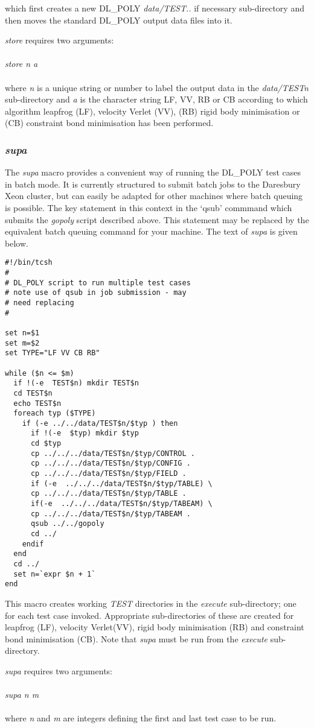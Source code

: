 \noindent which first creates a new DL\_POLY {\em data/TEST..} if necessary
sub-directory and then moves the standard
DL\_POLY output data files into it.

{\sl store} requires two arguments:\\~\\
{\sl store n a}\\~\\
\noindent where {\sl n} is a unique string or number to label the
output data in the {\em data/TESTn} sub-directory and {\sl a} is the
character string LF, VV, RB or CB according to which algorithm
leapfrog (LF), velocity Verlet (VV), (RB) rigid body minimisation or
(CB) constraint bond minimisation has been performed.

\subsubsection{{\sl supa}}
The {\sl supa} macro provides a convenient way of running the DL\_POLY test
cases in batch mode. It is currently structured to submit batch jobs to the
Daresbury Xeon cluster, but can easily be adapted for other machines where
batch queuing is possible. The key statement in this context in the `qsub'
commmand which submits the {\sl gopoly} script described above. This statement
may be replaced by the equivalent batch queuing command for your machine. The
text of {\sl supa} is given below.
\begin{verbatim}
#!/bin/tcsh
#
# DL_POLY script to run multiple test cases
# note use of qsub in job submission - may
# need replacing
#

set n=$1
set m=$2
set TYPE="LF VV CB RB"

while ($n <= $m)
  if !(-e  TEST$n) mkdir TEST$n
  cd TEST$n
  echo TEST$n
  foreach typ ($TYPE)
    if (-e ../../data/TEST$n/$typ ) then
      if !(-e  $typ) mkdir $typ
      cd $typ
      cp ../../../data/TEST$n/$typ/CONTROL .
      cp ../../../data/TEST$n/$typ/CONFIG .
      cp ../../../data/TEST$n/$typ/FIELD .
      if (-e  ../../../data/TEST$n/$typ/TABLE) \
      cp ../../../data/TEST$n/$typ/TABLE .
      if(-e  ../../../data/TEST$n/$typ/TABEAM) \
      cp ../../../data/TEST$n/$typ/TABEAM .
      qsub ../../gopoly
      cd ../
    endif
  end
  cd ../
  set n=`expr $n + 1`
end
\end{verbatim}

\noindent This macro creates working {\em TEST} directories in 
the {\em execute} sub-directory; one for each
test case invoked. Appropriate sub-directories of these are created for
leapfrog (LF), velocity Verlet(VV), rigid body minimisation (RB) and
constraint bond minimisation (CB). Note that {\sl supa} must be run
from the {\em execute} sub-directory.

{\sl supa} requires two arguments:\\~\\
{\sl supa n m}\\~\\
\noindent where {\sl n} and {\sl m} are integers defining the first
and last test case to be run.
\clearpage

